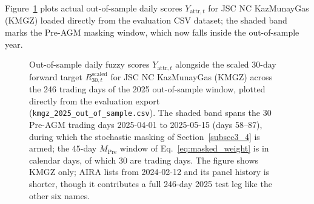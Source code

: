 \documentclass[pdflatex,sn-mathphys-num]{sn-jnl}
\theoremstyle{thmstyleone}
\theoremstyle{thmstyletwo}
\theoremstyle{thmstylethree}
\begin{document}
Figure~\ref{fig:kmgz_series} plots actual out-of-sample daily scores $Y_{\mathrm{attr},t}$ for JSC NC KazMunayGas (KMGZ) loaded directly from the evaluation CSV dataset; the shaded band marks the Pre-AGM masking window, which now falls inside the out-of-sample year.

\begin{figure}[htbp]
\centering
{}
\caption{Out-of-sample daily fuzzy scores $Y_{\mathrm{attr},t}$ alongside the scaled 30-day forward target $R_{30,t}^{\mathrm{scaled}}$ for JSC NC KazMunayGas (KMGZ) across the 246 trading days of the 2025 out-of-sample window, plotted directly from the evaluation export (\texttt{kmgz\_2025\_out\_of\_sample.csv}). The shaded band spans the $30$ Pre-AGM trading days 2025-04-01 to 2025-05-15 (days 58--87), during which the stochastic masking of Section~\ref{subsec3_4} is armed; the $45$-day $M_{\mathrm{Pre}}$ window of Eq.~\eqref{eq:masked_weight} is in calendar days, of which $30$ are trading days. The figure shows KMGZ only; AIRA lists from 2024-02-12 and its panel history is shorter, though it contributes a full 246-day 2025 test leg like the other six names.}
\label{fig:kmgz_series}
\end{figure}
\end{document}
